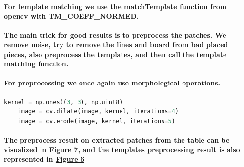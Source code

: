 \documentclass[12pt]{article}
\begin{document}
    \paragraph{For template matching we use the matchTemplate function from opencv with TM\_COEFF\_NORMED.}

    \paragraph{The main trick for good results is to preprocess the patches. We remove noise, try to remove the lines and board from bad placed pieces, also preprocess the templates, and then call the template matching function.}

    \paragraph{For preprocessing we once again use morphological operations.}
    \begin{lstlisting}[language=Python]
    kernel = np.ones((3, 3), np.uint8)
    image = cv.dilate(image, kernel, iterations=4)
    image = cv.erode(image, kernel, iterations=5)
    \end{lstlisting}

    \paragraph{The preprocess result on extracted patches from the table can be visualized in \hyperref[fig:patch-preprocessing]{Figure 7}, and the templates preprocessing result is also represented in \hyperref[fig:templates-preprocessing]{Figure 6}}
\end{document}
